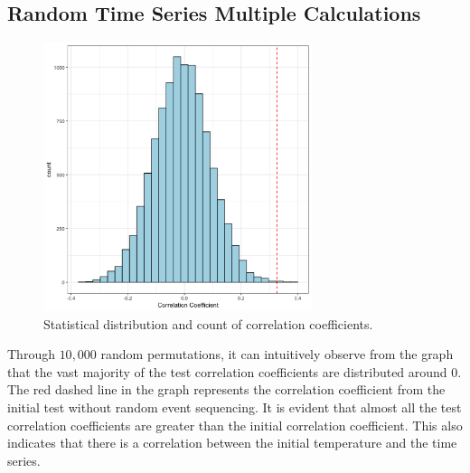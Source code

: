 \documentclass[a4paper,12pt]{article}
\begin{document}
\subsection{Random Time Series Multiple Calculations}
  \begin{figure}[ht]
    \centering
    \includegraphics[width=0.7\textwidth]{../data/ats_random_plot.png}
    \caption{Statistical distribution and count of correlation coefficients.}
  \end{figure}
  Through $10,000$ random permutations, it can intuitively observe from the graph that the vast majority of the test correlation coefficients are distributed around 0. The red dashed line in the graph represents the correlation coefficient from the initial test without random event sequencing. It is evident that almost all the test correlation coefficients are greater than the initial correlation coefficient. This also indicates that there is a correlation between the initial temperature and the time series.
\end{document}

